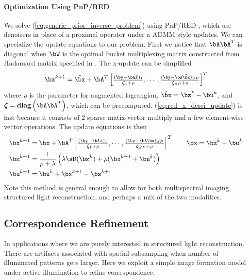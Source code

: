 \documentclass[../writeup.tex]{subfiles}
\begin{document}
\paragraph{Optimization Using PnP/RED}
We solve (\ref{eq:generic_prior_inverse_problem}) using PnP/RED \cite{venkatakrishnanPlugandPlayPriorsModel2013,romanoLittleEngineThat2016}, which use denoisers in place of a proximal operator under a ADMM style updates. We can specialize the update equations to our problem. First we notice that $\bA\bA^T$ is diagonal when $\bW$ is the optimal bucket multiplexing matrix constructed from Hadamard matrix specified in \cite{weiCodedTwoBucketCameras2018}. The x-update can be simplified  \cite{liuRankMinimizationSnapshot2019} 
\begin{align}
    \bx^{k+1} 
        = \tilde{\bx} + \bA^T \begin{bmatrix}
            \frac{(\by - \bA\tilde{x})_1}{\bzeta_1 + \rho},\cdots, \frac{(\by - \bA\tilde{\bx})_{SP}}{\bzeta_{SP} + \rho}
        \end{bmatrix}^T
    \label{eq:red_x_desci_update}
\end{align}
where $\rho$ is the parameter for augmented lagrangian, $\tilde{\bx} = \bz^k - \bu^k$, and $\bzeta = \diag \left(\bA\bA^T\right)$, which can be precomputed. (\ref{eq:red_x_desci_update}) is fast because it consists of 2 sparse matix-vector multiply and a few element-wise vector operations. The update equations is then
\begin{align} 
    \bx^{k+1}
        &= \tilde{\bx} + \bA^T \begin{bmatrix}
            \frac{(\by - \bA\tilde{x})_1}{\bzeta_1 + \rho},\cdots, \frac{(\by - \bA\tilde{\bx})_{SP}}{\bzeta_{SP} + \rho}
        \end{bmatrix}^T
        \qquad \tilde{\bx} = \bz^k - \bu^k \\
    \bz^{k+1}
        &= \frac{1}{\rho + \lambda} \left(
            \lambda \sD(\bz^{k}) + \rho ( \bx^{k+1} + \bu^k  )
        \right) \\
    \bu^{k+1}
        &= \bu^k + \bx^{k+1} - \bz^{k+1}
    \label{eq:red_admm_update_equations_fast_x_update}
\end{align}
Note this method is general enough to allow for both multispectral imaging, structured light reconstruction, and perhaps a mix of the two modalities.

 

\subsection{Correspondence Refinement}
In applications where we are purely interested in structured light reconstruction. There are artifacts associated with spatial subsampling when number of illuminated patterns gets larger. Here we exploit a simple image formation model under active illumination to refine correspondence.
\end{document}
